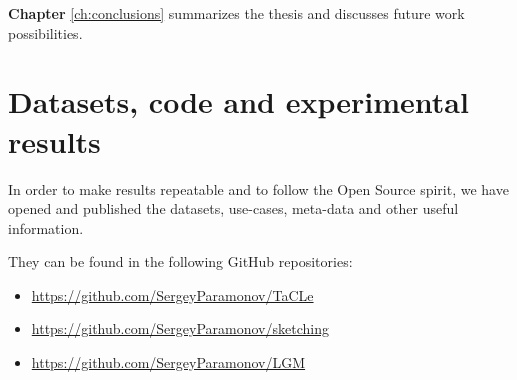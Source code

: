 \textbf{Chapter} \ref{ch:conclusions} summarizes the thesis and
discusses future work possibilities.

\section{Datasets, code and experimental results}
In order to make results repeatable and to follow the Open Source
spirit, we have opened and published the datasets, use-cases,
meta-data and other useful information.

They can be found in the following GitHub repositories:
\begin{itemize}
\item \url{https://github.com/SergeyParamonov/TaCLe}
\item \url{https://github.com/SergeyParamonov/sketching}
\item \url{https://github.com/SergeyParamonov/LGM}
\end{itemize}
\cleardoublepage
